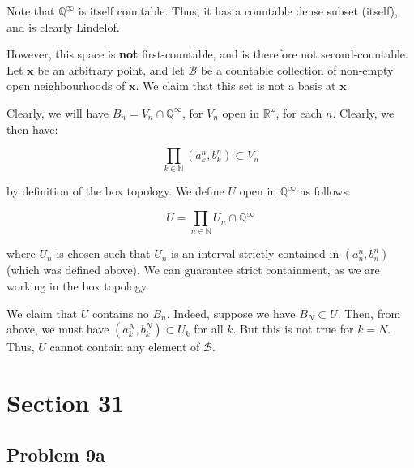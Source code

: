 \documentclass[10pt, oneside]{amsart}
\newcommand{\bm}{\boldsymbol}
\begin{document}
    Note that $\mathbb{Q}^{\infty}$ is itself countable. Thus, it has a countable dense subset (itself), and is clearly Lindelof.
    \newline

    However, this space is \textbf{not} first-countable, and is therefore not second-countable. Let $\bm{x}$ be an arbitrary point, and let $\mathcal{B}$ be a countable collection
    of non-empty open neighbourhoods of $\bm{x}$. We claim that this set is not a basis at $\bm{x}$.
    \newline

    Clearly, we will have $B_n = V_n \cap \mathbb{Q}^{\infty}$, for $V_n$ open in $\mathbb{R}^{\omega}$, for each $n$. Clearly, we then have:

    $$\displaystyle\prod_{k \in \mathbb{N}} (a^{n}_k, b^{n}_k) \subset V_n$$

    by definition of the box topology. We define $U$ open in $\mathbb{Q}^{\infty}$ as follows:

    $$U = \displaystyle\prod_{n \in \mathbb{N}} U_n \cap \mathbb{Q}^{\infty}$$

    where $U_n$ is chosen such that $U_n$ is an interval strictly contained in $(a^{n}_{n}, b^{n}_{n})$ (which was defined above). We can guarantee strict containment, as we are working in the box
    topology.
    \newline

    We claim that $U$ contains no $B_n$. Indeed, suppose we have $B_N \subset U$. Then, from above, we must have $(a^{N}_k, b^{N}_k) \subset U_k$ for all $k$. But this is not true for $k = N$.
    Thus, $U$ cannot contain any element of $\mathcal{B}$.

    \hrulefill

    \section{Section 31}

    \hrulefill

    \subsection{Problem 9a}

    \hrulefill

    
\end{document}
